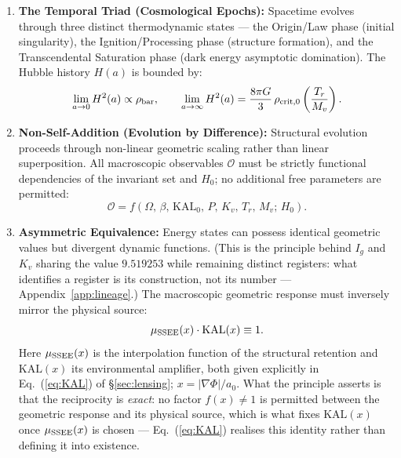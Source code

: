 \documentclass[12pt,a4paper]{article}
\newcommand{\SSEE}{\ifmmode\mathrm{SSEE}\else\textsc{ssee}\fi}
\newcommand{\KALz}{\mathrm{KAL}_0}
\begin{document}
\begin{enumerate}
  \item \textbf{The Temporal Triad (Cosmological Epochs):} Spacetime evolves through three
  distinct thermodynamic states — the Origin/Law phase (initial singularity), the
  Ignition/Processing phase (structure formation), and the Transcendental Saturation phase
  (dark energy asymptotic domination). The Hubble history $H(a)$ is bounded by:
  \begin{equation}
    \lim_{a\to0} H^2(a) \propto \rho_{\rm bar},
    \qquad
    \lim_{a\to\infty} H^2(a) = \frac{8\pi G}{3}\,\rho_{{\rm crit},0}
    \left(\frac{T_r}{M_v}\right).
  \end{equation}

  \item \textbf{Non-Self-Addition (Evolution by Difference):} Structural evolution proceeds
  through non-linear geometric scaling rather than linear superposition. All macroscopic
  observables $\mathcal{O}$ must be strictly functional dependencies of the invariant set
  and $H_0$; no additional free parameters are permitted:
  \begin{equation}
    \mathcal{O} = f(\Omega,\,\beta,\,\KALz,\,P,\,K_v,\,T_r,\,M_v;\,H_0).
  \end{equation}

  \item \textbf{Asymmetric Equivalence:} Energy states can possess identical geometric
  values but divergent dynamic functions. (This is the principle behind $I_g$ and $K_v$
  sharing the value $9.519253$ while remaining distinct registers: what identifies a
  register is its construction, not its number --- Appendix~\ref{app:lineage}.) The macroscopic geometric response must inversely
  mirror the physical source:
  \begin{equation}
    \mu_{\SSEE}(x)\cdot\mathrm{KAL}(x) \equiv 1.
    \label{eq:asymmetric}
  \end{equation}
  Here $\mu_{\SSEE}(x)$ is the interpolation function of the structural retention
  and $\mathrm{KAL}(x)$ its environmental amplifier, both given explicitly in
  Eq.~(\ref{eq:KAL}) of §\ref{sec:lensing}; $x=|\nabla\Phi|/a_0$. What the
  principle asserts is that the reciprocity is \emph{exact}: no factor $f(x)\neq1$
  is permitted between the geometric response and its physical source, which is
  what fixes $\mathrm{KAL}(x)$ once $\mu_{\SSEE}(x)$ is chosen --- Eq.~(\ref{eq:KAL})
  realises this identity rather than defining it into existence.

\end{enumerate}
\end{document}
